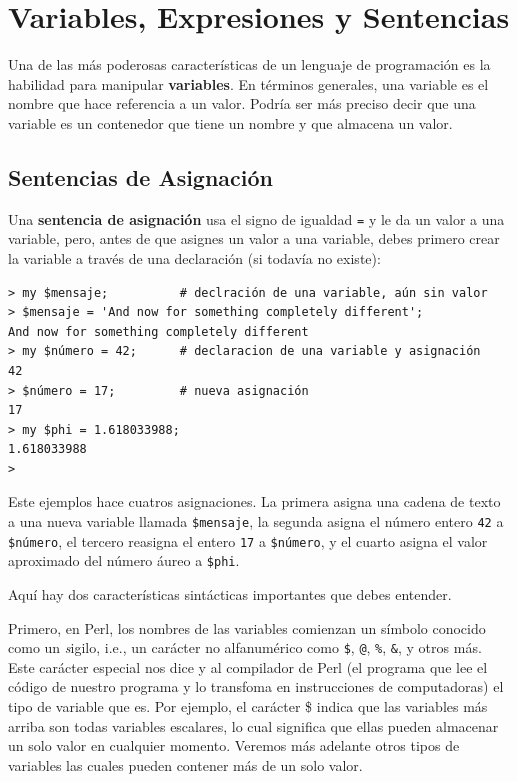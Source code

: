 \chapter{Variables, Expresiones y Sentencias}

Una de las más poderosas características de un lenguaje de programación
es la habilidad para manipular {\bf variables}. En términos generales, 
una variable es el nombre que hace referencia a un valor. Podría ser 
más preciso decir que una variable es un contenedor  
que tiene un nombre y que almacena un valor.


\section{Sentencias de Asignación}
\label{variables}


Una {\bf sentencia de asignación} usa el signo de igualdad {\tt =}
y le da un valor a una variable, pero, antes de que asignes un valor 
a una variable, debes primero crear la variable a través de una
declaración (si todavía no existe):
\begin{verbatim}
> my $mensaje;          # declración de una variable, aún sin valor
> $mensaje = 'And now for something completely different';
And now for something completely different
> my $número = 42;      # declaracion de una variable y asignación
42
> $número = 17;         # nueva asignación
17
> my $phi = 1.618033988;
1.618033988
>
\end{verbatim}
%

Este ejemplos hace cuatros asignaciones. La primera asigna una cadena de texto
a una nueva variable llamada {\tt \$mensaje}, la segunda asigna 
el número entero {\tt 42} a {\tt \$número}, el tercero reasigna el entero {\tt 17} a
{\tt \$número}, y el cuarto asigna el valor aproximado del número áureo a {\tt \$phi}.

Aquí hay dos características sintácticas importantes que debes entender.

Primero, en Perl, los nombres de las variables comienzan un 
símbolo conocido como un {\emph sigilo}, i.e., un carácter no alfanumérico
como \verb'$', \verb'@', \verb'%', \verb'&', y otros más. Este carácter
especial nos dice y al compilador de Perl (el programa que lee
el código de nuestro programa y lo transfoma en instrucciones 
de computadoras) el tipo de variable que es. Por ejemplo, el 
carácter \$ indica que las variables más arriba son todas variables
escalares, lo cual significa que ellas pueden almacenar un solo valor
en cualquier momento. Veremos más adelante otros tipos de variables las
cuales pueden contener más de un solo valor.

